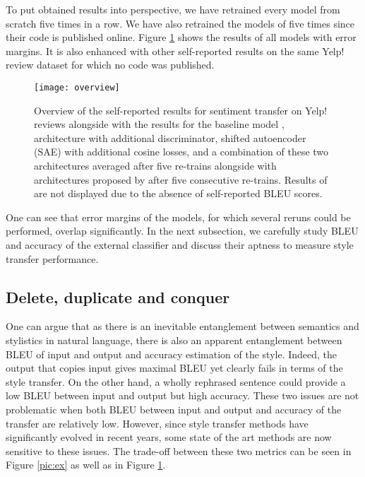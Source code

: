 \documentclass[11pt,a4paper]{article}
\begin{document}
To put obtained results into perspective, we have retrained every model from scratch five times in a row. We have also retrained the models of \citet{tian18} five times since their code is published online. Figure \ref{pic:ov} shows the results of all models with error margins. It is also enhanced with other self-reported results on the same Yelp! review dataset for which no code was published. 

\begin{figure}[ht]
\begin{center}
\centerline{\texttt{[image: overview]}}
\caption{Overview of the self-reported results for sentiment transfer on Yelp! reviews alongside with the results for the baseline model \cite{hylsx}, architecture with additional discriminator, shifted autoencoder (SAE) with additional cosine losses, and a combination of these two architectures averaged after five re-trains alongside with architectures proposed by \cite{tian18} after five consecutive re-trains. Results of \cite{romanov18} are not displayed due to the absence of self-reported BLEU scores.}
\label{pic:ov}
\end{center}
\end{figure}

One can see that error margins of the models, for which several reruns could be performed, overlap significantly. In the next subsection, we carefully study BLEU and accuracy of the external classifier and discuss their aptness to measure style transfer performance.

\subsection{Delete, duplicate and conquer}
\label{sec:disc}

One can argue that as there is an inevitable entanglement between semantics and stylistics in natural language, there is also an apparent entanglement between BLEU of input and output and accuracy estimation of the style. Indeed, the output that copies input gives maximal BLEU yet clearly fails in terms of the style transfer. On the other hand, a wholly rephrased sentence could provide a low BLEU between input and output but high accuracy. These two issues are not problematic when both BLEU between input and output and accuracy of the transfer are relatively low. However, since style transfer methods have significantly evolved in recent years, some state of the art methods are now sensitive to these issues. The trade-off between these two metrics can be seen in Figure \ref{pic:ex} as well as in Figure \ref{pic:ov}.
\end{document}
